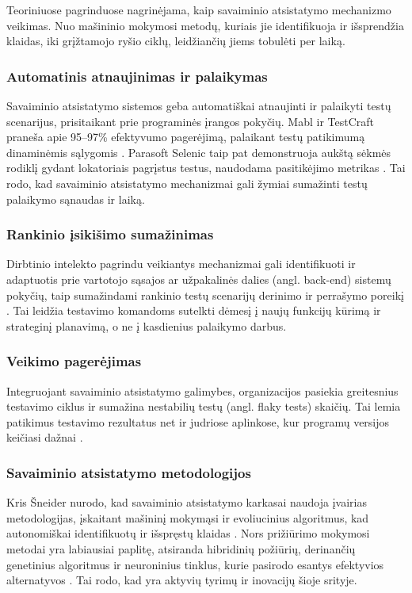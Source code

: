 \documentclass[
]{VUMIFPSkursinis}
\begin{document}
Teoriniuose pagrinduose nagrinėjama, kaip savaiminio atsistatymo mechanizmo veikimas. Nuo mašininio mokymosi metodų, kuriais jie identifikuoja ir išsprendžia klaidas, iki grįžtamojo ryšio ciklų, leidžiančių jiems tobulėti per laiką.

\subsubsection{Automatinis atnaujinimas ir palaikymas}
Savaiminio atsistatymo sistemos geba automatiškai atnaujinti ir palaikyti testų scenarijus, prisitaikant prie programinės įrangos pokyčių. Mabl ir TestCraft praneša apie 95–97\% efektyvumo pagerėjimą, palaikant testų patikimumą dinaminėmis sąlygomis \cite[6]{Garousi2024}. Parasoft Selenic taip pat demonstruoja aukštą sėkmės rodiklį gydant lokatoriais pagrįstus testus, naudodama pasitikėjimo metrikas \cite[8]{Garousi2024}. Tai rodo, kad savaiminio atsistatymo mechanizmai gali žymiai sumažinti testų palaikymo sąnaudas ir laiką.

\subsubsection{Rankinio įsikišimo sumažinimas}
Dirbtinio intelekto pagrindu veikiantys mechanizmai gali identifikuoti ir adaptuotis prie vartotojo sąsajos ar užpakalinės dalies (angl. back-end) sistemų pokyčių, taip sumažindami rankinio testų scenarijų derinimo ir perrašymo poreikį \cite[2]{SSRN2023}. Tai leidžia testavimo komandoms sutelkti dėmesį į naujų funkcijų kūrimą ir strateginį planavimą, o ne į kasdienius palaikymo darbus.
\subsubsection{Veikimo pagerėjimas}
Integruojant savaiminio atsistatymo galimybes, organizacijos pasiekia greitesnius testavimo ciklus ir sumažina nestabilių testų (angl. flaky tests) skaičių. Tai lemia patikimus testavimo rezultatus net ir judriose aplinkose, kur programų versijos keičiasi dažnai \cite[5]{SSRN2023}.

\subsubsection{Savaiminio atsistatymo metodologijos}
Kris Šneider nurodo, kad savaiminio atsistatymo karkasai naudoja įvairias metodologijas, įskaitant mašininį mokymąsi ir evoliucinius algoritmus, kad autonomiškai identifikuotų ir išspręstų klaidas \cite[15]{Schneider2013}. Nors prižiūrimo mokymosi metodai yra labiausiai paplitę, atsiranda hibridinių požiūrių, derinančių genetinius algoritmus ir neuroninius tinklus, kurie pasirodo esantys efektyvios alternatyvos \cite[17]{Schneider2013}. Tai rodo, kad yra aktyvių tyrimų ir inovacijų šioje srityje.
\end{document}
